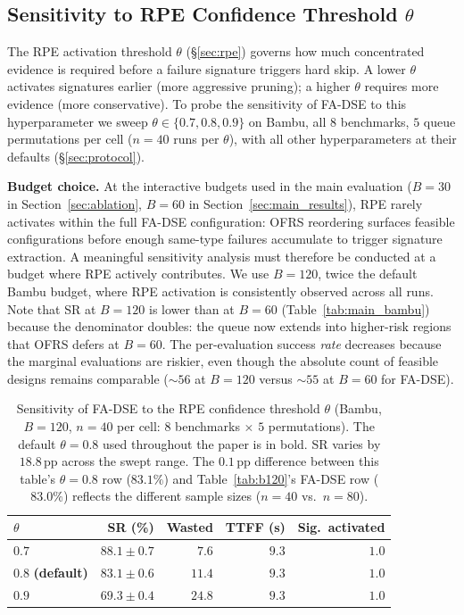 \documentclass[journal]{IEEEtran}
\begin{document}
\subsection{Sensitivity to RPE Confidence Threshold $\theta$}
\label{sec:theta_sensitivity}

The RPE activation threshold $\theta$ (\S\ref{sec:rpe}) governs how much concentrated evidence is required before a failure signature triggers hard skip. A lower $\theta$ activates signatures earlier (more aggressive pruning); a higher $\theta$ requires more evidence (more conservative). To probe the sensitivity of FA-DSE to this hyperparameter we sweep $\theta \in \{0.7, 0.8, 0.9\}$ on Bambu, all $8$ benchmarks, $5$ queue permutations per cell ($n{=}40$ runs per $\theta$), with all other hyperparameters at their defaults (\S\ref{sec:protocol}).

\textbf{Budget choice.} At the interactive budgets used in the main evaluation ($B{=}30$ in Section~\ref{sec:ablation}, $B{=}60$ in Section~\ref{sec:main_results}), RPE rarely activates within the full FA-DSE configuration: OFRS reordering surfaces feasible configurations before enough same-type failures accumulate to trigger signature extraction. A meaningful sensitivity analysis must therefore be conducted at a budget where RPE actively contributes. We use $B{=}120$, twice the default Bambu budget, where RPE activation is consistently observed across all runs. Note that SR at $B{=}120$ is lower than at $B{=}60$ (Table~\ref{tab:main_bambu}) because the denominator doubles: the queue now extends into higher-risk regions that OFRS defers at $B{=}60$. The per-evaluation success \emph{rate} decreases because the marginal evaluations are riskier, even though the absolute count of feasible designs remains comparable ($\sim 56$ at $B{=}120$ versus $\sim 55$ at $B{=}60$ for FA-DSE).

\begin{table}[t]
\centering
\caption{Sensitivity of FA-DSE to the RPE confidence threshold $\theta$ (Bambu, $B{=}120$, $n{=}40$ per cell: $8$ benchmarks $\times$ $5$ permutations). The default $\theta{=}0.8$ used throughout the paper is in bold. SR varies by $18.8$\,pp across the swept range. The $0.1$\,pp difference between this table's $\theta{=}0.8$ row ($83.1\%$) and Table~\ref{tab:b120}'s FA-DSE row ($83.0\%$) reflects the different sample sizes ($n{=}40$ vs.\ $n{=}80$).}
\label{tab:theta_sensitivity}
\begin{tabular}{lrrrr}
\toprule
$\theta$ & SR (\%) & Wasted & TTFF (s) & Sig.\ activated \\
\midrule
$0.7$ & $88.1 \pm 0.7$ & $7.6$ & $9.3$ & $1.0$ \\
$\mathbf{0.8}$ \textbf{(default)} & $\mathbf{83.1 \pm 0.6}$ & $\mathbf{11.4}$ & $\mathbf{9.3}$ & $\mathbf{1.0}$ \\
$0.9$ & $69.3 \pm 0.4$ & $24.8$ & $9.3$ & $1.0$ \\
\bottomrule
\end{tabular}
\end{table}
\end{document}
